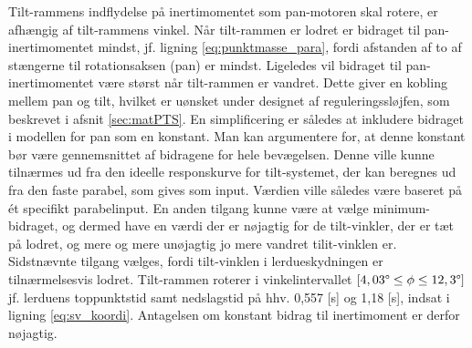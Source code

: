Tilt-rammens indflydelse på inertimomentet som pan-motoren skal rotere, er afhængig af tilt-rammens vinkel.
Når tilt-rammen er lodret er bidraget til pan-inertimomentet mindst, jf. ligning \ref{eq:punktmasse_para}, fordi afstanden
af to af stængerne til rotationsaksen (pan) er mindst. Ligeledes vil bidraget til pan-inertimomentet være størst når tilt-rammen er vandret.
Dette giver en kobling mellem pan og tilt, hvilket er uønsket under designet af reguleringssløjfen, som beskrevet i afsnit \ref{sec:matPTS}.
En simplificering er således at inkludere bidraget i modellen for pan som en konstant.
Man kan argumentere for, at denne konstant bør være gennemsnittet af bidragene for hele bevægelsen.
Denne ville kunne tilnærmes ud fra den ideelle responskurve for tilt-systemet, der kan beregnes ud fra den faste parabel, som gives som input.
Værdien ville således være baseret på ét specifikt parabelinput. En anden tilgang kunne være at vælge minimum-bidraget, og dermed
have en værdi der er nøjagtig for de tilt-vinkler, der er tæt på lodret, og mere og mere unøjagtig jo mere vandret tilit-vinklen er.
Sidstnævnte tilgang vælges, fordi tilt-vinklen i lerdueskydningen er tilnærmelsesvis lodret. Tilt-rammen roterer i vinkelintervallet \([4,03\degree \leq \phi \leq 12,3\degree]\) jf. lerduens toppunktstid samt nedslagstid på hhv. 0,557 [s] og 1,18 [s], indsat i ligning \ref{eq:sv_koordi}. Antagelsen om konstant bidrag til inertimoment er derfor nøjagtig.

